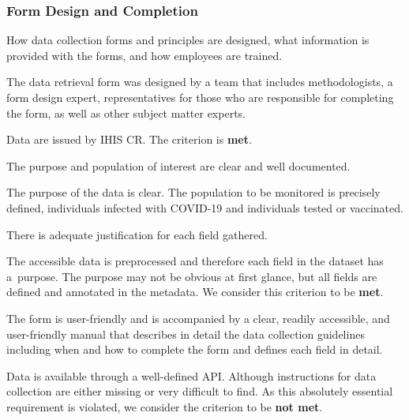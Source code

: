 \subsubsection{Form Design and Completion}

How data collection forms and principles are designed, what information is provided with the forms, and how employees are trained.

\begin{QandA}
    \item The data retrieval form was designed by a team that includes methodologists, a form design expert, representatives for those who are responsible for completing the form, as well as other subject matter experts.
    \begin{answered}
        Data are issued by IHIS CR.
        The criterion is \textbf{met}.
    \end{answered}

    \item The purpose and population of interest are clear and well documented.
    \begin{answered}
        The purpose of the data is clear.
        The population to be monitored is precisely defined, individuals infected with COVID-19 and individuals tested or vaccinated.
    \end{answered}

    \item There is adequate justification for each field gathered.
    \begin{answered}
        The accessible data is preprocessed and therefore each field in the dataset has a~purpose.
        The purpose may not be obvious at first glance, but all fields are defined and annotated in the metadata. 
        We consider this criterion to be \textbf{met}.
    \end{answered}

    \item The form is user-friendly and is accompanied by a clear, readily accessible, and user-friendly manual that describes in detail the data collection guidelines including when and how to complete the form and defines each field in detail.
    \begin{answered}
        Data is available through a well-defined API.
        Although instructions for data collection are either missing or very difficult to find.
        As this absolutely essential requirement is violated, we consider the criterion to be \textbf{not met}.
    \end{answered}


\end{QandA}
